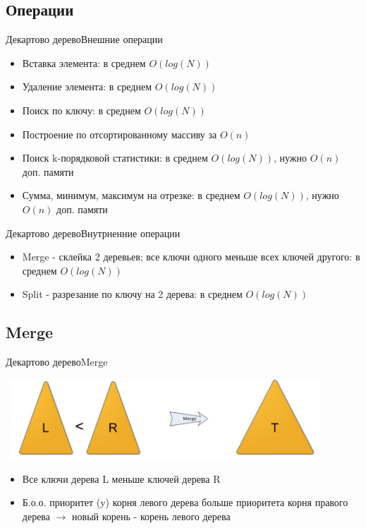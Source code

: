 \documentclass[10pt]{beamer}
\begin{document}
\subsection{Операции}
\begin{frame}[fragile]{Декартово дерево}{Внешние операции}
\begin{itemize}
    \item Вставка элемента: в среднем $O(log(N))$
    \item Удаление элемента: в среднем $O(log(N))$
    \item Поиск по ключу: в среднем $O(log(N))$
    \item Построение по отсортированному массиву за $O(n)$
    \item Поиск k-порядковой статистики: в среднем $O(log(N))$, нужно $O(n)$ доп. памяти
    \item Сумма, минимум, максимум на отрезке: в среднем $O(log(N))$, нужно $O(n)$ доп. памяти
\end{itemize}
\end{frame}

\begin{frame}[fragile]{Декартово дерево}{Внутрненние операции}
\begin{itemize}
    \item Merge - склейка 2 деревьев; все ключи одного меньше всех ключей другого: в среднем $O(log(N))$
    \item Split - разрезание по ключу на 2 дерева: в среднем $O(log(N))$
\end{itemize}
\end{frame}

\subsection{Merge}
\begin{frame}[fragile]{Декартово дерево}{Merge}
\begin{center}
    \includegraphics[width=12cm, height=3cm]{Term_1/Source/Pirctures/treap_merge.jpg}\\
\end{center}
\begin{itemize}
    \item Все ключи дерева L меньше ключей дерева R
    \item Б.о.о. приоритет (y) корня левого дерева больше приоритета корня правого дерева $\rightarrow$ новый корень - корень левого дерева
\end{itemize}
\end{frame}
\end{document}
